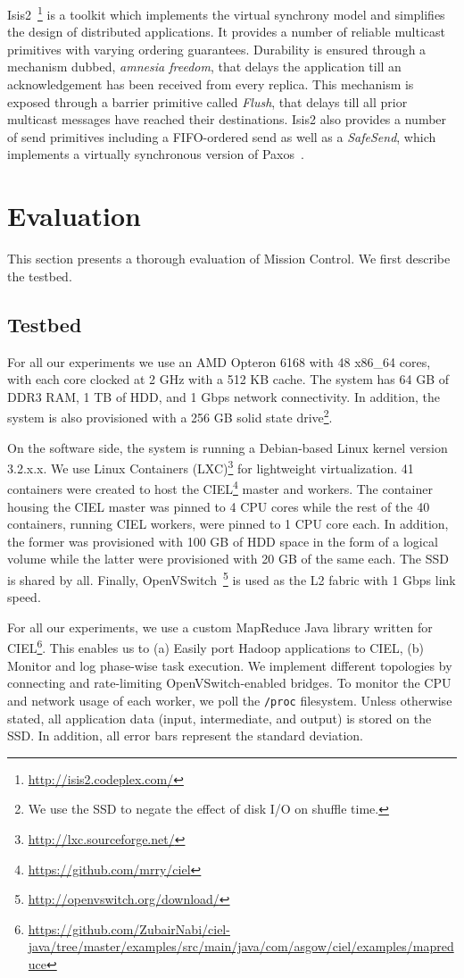 \documentclass[a4paper,12pt,twoside,openright]{report}
\begin{document}
Isis2~\cite{Birman:2012:OCW}\footnote{\url{http://isis2.codeplex.com/}} is a
toolkit which implements the virtual synchrony model and simplifies the design
of distributed applications. It provides a number of reliable multicast
primitives with varying ordering guarantees. Durability is ensured through a
mechanism dubbed, \emph{amnesia freedom}, that delays the application till an
acknowledgement has been received from every replica. This mechanism is exposed
through a barrier primitive called \emph{Flush}, that delays till all prior
multicast messages have reached their destinations. Isis2 also provides a number
of send primitives including a FIFO-ordered send as well as a \emph{SafeSend},
which implements a virtually synchronous version of
Paxos~\cite{Lamport:1998:PP}.

\chapter{Evaluation}\label{chapter:evaluation}
This section presents a thorough evaluation of Mission Control. We first
describe the testbed.

\section{Testbed}
For all our experiments we use an AMD Opteron 6168 with 48 x86\_64 cores, with
each core clocked at 2 GHz with a 512 KB cache. The system has 64 GB of DDR3
RAM, 1 TB of HDD, and 1 Gbps network connectivity. In addition, the system is
also provisioned with a 256 GB solid state drive\footnote{We use the SSD to
negate the effect of disk I/O on shuffle time.}.

On the software side, the system is running a Debian-based Linux kernel version
3.2.x.x. We use Linux Containers
(LXC)\footnote{\url{http://lxc.sourceforge.net/}} for lightweight
virtualization. 41 containers were created to host the
CIEL\footnote{\url{https://github.com/mrry/ciel}} master and workers. The
container housing the CIEL master was pinned to 4 CPU cores while the rest of
the 40 containers, running CIEL workers, were pinned to 1 CPU core each. In
addition, the former was provisioned with 100 GB of HDD space in the form of a
logical volume while the latter were provisioned with 20 GB of the same each.
The SSD is shared by all. Finally,
OpenVSwitch~\cite{Pfaff:2009:ENI}\footnote{\url{http://openvswitch.org/download/}}
is used as the L2 fabric with 1 Gbps link speed.

For all our experiments, we use a custom MapReduce Java library written for
CIEL\footnote{\url{https://github.com/ZubairNabi/ciel-java/tree/master/examples/src/main/java/com/asgow/ciel/examples/mapreduce}}.
This enables us to (a) Easily port Hadoop applications to CIEL, (b) Monitor and
log phase-wise task execution. We implement different topologies by connecting
and rate-limiting OpenVSwitch-enabled bridges. To monitor the CPU and network
usage of each worker, we poll the \texttt{/proc} filesystem. Unless otherwise
stated, all application data (input, intermediate, and output) is stored on the
SSD. In addition, all error bars represent the standard deviation.
\end{document}
